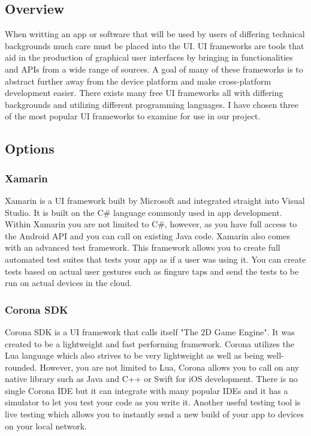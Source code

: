 \documentclass[onecolumn, draftclsnofoot,10pt, compsoc]{IEEEtran}
\begin{document}
	\subsection{Overview}
		When writting an app or software that will be used by users of differing technical backgrounds much care must be placed into the UI.
		UI frameworks are tools that aid in the production of graphical user interfaces by bringing in functionalities and APIs from a wide range of sources.
		A goal of many of these frameworks is to abstract further away from the device platform and make cross-platform development easier.
		There exists many free UI frameworks all with differing backgrounds and utilizing different programming languages.
		I have chosen three of the most popular UI frameworks to examine for use in our project.

	\subsection{Options}
		\subsubsection{Xamarin}
			Xamarin is a UI framework built by Microsoft and integrated straight into Visual Studio.
			It is built on the C\# language commonly used in app development.
			Within Xamarin you are not limited to C\#, however, as you have full access to the Android API and you can call on existing Java code\cite{xamarin_platform}.
			Xamarin also comes with an advanced test framework.
			This framework allows you to create full automated test suites that tests your app as if a user was using it.
			You can create tests based on actual user gestures such as fingure taps and send the tests to be run on actual devices in the cloud\cite{xamarin_test}.

		\subsubsection{Corona SDK}
			Corona SDK is a UI framework that calls itself "The 2D Game Engine".
			It was created to be a lightweight and fast performing framework.
			Corona utilizes the Lua language which also strives to be very lightweight as well as being well-rounded.
			However, you are not limited to Lua, Corona allows you to call on any native library such as Java and C++ or Swift for iOS development.
			There is no single Corona IDE but it can integrate with many popular IDEs and it has a simulator to let you test your code as you write it.
			Another useful testing tool is live testing which allows you to instantly send a new build of your app to devices on your local network\cite{corona_overview}.
\end{document}
